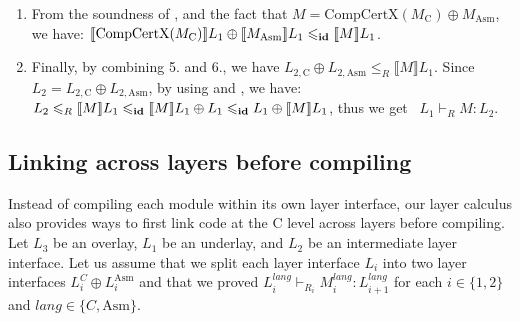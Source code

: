 \begin{enumerate}
\item From the soundness of 
, 
and the fact that  $M = \textrm{CompCertX}(M_\text{C}) \oplus M_\text{Asm}$,
we have:
$\llbracket \textrm{CompCertX}(M_\text{C}) \rrbracket L_1 \oplus
\llbracket M_\text{Asm} \rrbracket L_1 \leqslant_{\textbf{id}} \llbracket
M \rrbracket
L_1$.
\item
Finally, by combining 5. and 6., we have 
$L_{2, \text{C}} \oplus L_{2, \text{Asm}}
\leqslant_R  \llbracket M \rrbracket L_1$.  
Since~ $L_2 = L_{2, \text{C}} \oplus L_{2, \text{Asm}}$, 
by using 
and ,
we have: 
$L_2 \leqslant_R  \llbracket M \rrbracket L_1
\leqslant_{\textbf{id}} \llbracket M \rrbracket L_1 \oplus L_1
\leqslant_{\textbf{id}} L_1 \oplus \llbracket M \rrbracket L_1$,
thus we get ~$L_1 \vdash_R M : L_2$.
\end{enumerate} 



\subsection{Linking across layers before compiling}

Instead of compiling each module within its own layer interface, our layer
calculus also provides ways to first link code at the C level across
layers before compiling. Let $L_3$ be an overlay, $L_1$ be an
underlay, and $L_2$ be an intermediate layer interface. Let us assume that we
split each layer interface $L_i$ into two layer interfaces $L_i^C \oplus
L_i^{\mathrm{Asm}}$ and that we proved $L_{i}^{\mathit{lang}} \vdash_{R_i}
M_i^{\mathit{lang}}: L_{i+1}^{\mathit{lang}}$ for each $i \in \{1,2
\}$ and $\mathit{lang} \in \{ C, \mathrm{Asm} \}$.

